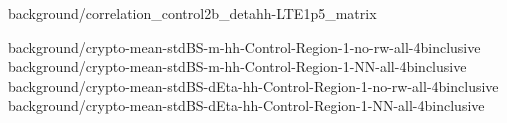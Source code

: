 {background/correlation_control2b_detahh-LTE1p5_matrix}

{background/crypto-mean-stdBS-m-hh-Control-Region-1-no-rw-all-4binclusive}
{background/crypto-mean-stdBS-m-hh-Control-Region-1-NN-all-4binclusive}
{background/crypto-mean-stdBS-dEta-hh-Control-Region-1-no-rw-all-4binclusive}
{background/crypto-mean-stdBS-dEta-hh-Control-Region-1-NN-all-4binclusive}

